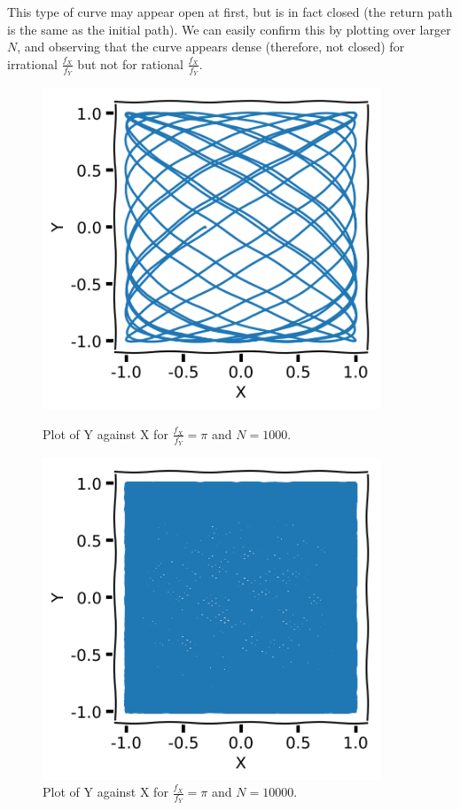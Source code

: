 \documentclass[11pt]{article}
\begin{document}
This type of curve may appear open at first, but is in fact closed (the return path is the same as the initial path). We can easily confirm this by plotting over larger $N$, and observing that the curve appears dense (therefore, not closed) for irrational $\frac{f_X}{f_Y}$ but not for rational $\frac{f_X}{f_Y}$.

\begin{figure}[htp]
\centering
	\begin{minipage}{0.45\textwidth}
	\centering
	\includegraphics[width=0.9\textwidth]{lissajous_1.57_1_1_1_0_0.01_1000.png}
	\caption{Plot of Y against X for $\frac{f_X}{f_Y}=\pi$ and $N=1000$.}
	\label{ratio1.57}
	\end{minipage}\hfill	
	\begin{minipage}{0.45\textwidth}
	\centering
	\includegraphics[width=0.9\textwidth]{lissajous_1.57_1_1_1_0_0.01_10000.png}
	\caption{Plot of Y against X for $\frac{f_X}{f_Y}=\pi$ and $N=10000$.}
	\label{ratio1.57_2}
	\end{minipage}
\end{figure}
\end{document}
